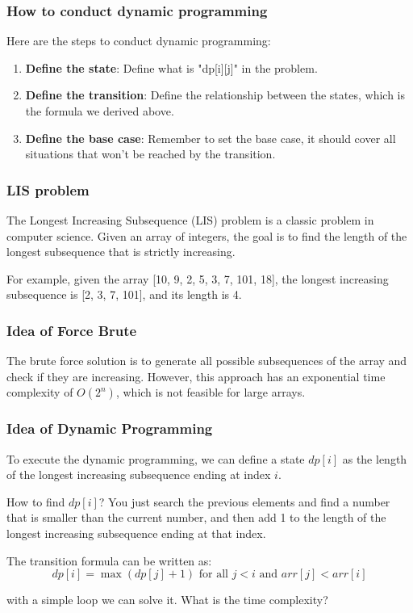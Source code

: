 \documentclass[xcolor=dvipsnames]{beamer}
\begin{document}
    \begin{frame}
        \frametitle{How to conduct dynamic programming}
        Here are the steps to conduct dynamic programming:
        \begin{enumerate}
            \item \textbf{Define the state}: Define what is "dp[i][j]" in the problem.
            \item \textbf{Define the transition}: Define the relationship between the states, which is the formula we derived above.
            \item \textbf{Define the base case}: Remember to set the base case, it should cover all situations that won't be reached by the transition.
        \end{enumerate}
    \end{frame}

    \begin{frame}
        \frametitle{LIS problem}
        The Longest Increasing Subsequence (LIS) problem is a classic problem in computer science.
        Given an array of integers, the goal is to find the length of the longest subsequence
        that is strictly increasing.

        For example, given the array [10, 9, 2, 5, 3, 7, 101, 18], the longest increasing
        subsequence is [2, 3, 7, 101], and its length is 4.
    \end{frame}

    \begin{frame}
        \frametitle{Idea of Force Brute}
        The brute force solution is to generate all possible subsequences of the array and check
        if they are increasing. However, this approach has an exponential time complexity of $O(2^n)$,
        which is not feasible for large arrays.
    \end{frame}

    \begin{frame}
        \frametitle{Idea of Dynamic Programming}
        To execute the dynamic programming, we can define a state $dp[i]$ as the length of the longest increasing subsequence
        ending at index $i$. 

        How to find $dp[i]$? You just search the previous elements and find a number that is smaller than the current number,
        and then add 1 to the length of the longest increasing subsequence ending at that index.

        The transition formula can be written as:
        $$ dp[i] = \max(dp[j] + 1) \text{ for all } j < i \text{ and } arr[j] < arr[i] $$   

        with a simple loop we can solve it. What is the time complexity?
    \end{frame}
\end{document}
